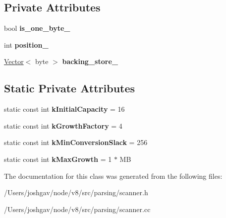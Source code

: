 \subsection*{Private Attributes}
\begin{DoxyCompactItemize}
\item 
bool {\bfseries is\+\_\+one\+\_\+byte\+\_\+}\hypertarget{classv8_1_1internal_1_1_literal_buffer_a0b65b23299a5431ba63163fb160f322f}{}\label{classv8_1_1internal_1_1_literal_buffer_a0b65b23299a5431ba63163fb160f322f}

\item 
int {\bfseries position\+\_\+}\hypertarget{classv8_1_1internal_1_1_literal_buffer_a65bf399de7ac72982a00ea580d3f575f}{}\label{classv8_1_1internal_1_1_literal_buffer_a65bf399de7ac72982a00ea580d3f575f}

\item 
\hyperlink{classv8_1_1internal_1_1_vector}{Vector}$<$ byte $>$ {\bfseries backing\+\_\+store\+\_\+}\hypertarget{classv8_1_1internal_1_1_literal_buffer_af72802fe1474aa6ccb1b0817d3b0252c}{}\label{classv8_1_1internal_1_1_literal_buffer_af72802fe1474aa6ccb1b0817d3b0252c}

\end{DoxyCompactItemize}
\subsection*{Static Private Attributes}
\begin{DoxyCompactItemize}
\item 
static const int {\bfseries k\+Initial\+Capacity} = 16\hypertarget{classv8_1_1internal_1_1_literal_buffer_a7e5dc5f31917faabf585f4283e0dad0b}{}\label{classv8_1_1internal_1_1_literal_buffer_a7e5dc5f31917faabf585f4283e0dad0b}

\item 
static const int {\bfseries k\+Growth\+Factory} = 4\hypertarget{classv8_1_1internal_1_1_literal_buffer_a26fbee59e283beb22b7525aaf870ad5d}{}\label{classv8_1_1internal_1_1_literal_buffer_a26fbee59e283beb22b7525aaf870ad5d}

\item 
static const int {\bfseries k\+Min\+Conversion\+Slack} = 256\hypertarget{classv8_1_1internal_1_1_literal_buffer_a158d7aced55af763b931223f5a8fdd5c}{}\label{classv8_1_1internal_1_1_literal_buffer_a158d7aced55af763b931223f5a8fdd5c}

\item 
static const int {\bfseries k\+Max\+Growth} = 1 $\ast$ MB\hypertarget{classv8_1_1internal_1_1_literal_buffer_a0613a4c4b0e516c72f15d24ff9689a9b}{}\label{classv8_1_1internal_1_1_literal_buffer_a0613a4c4b0e516c72f15d24ff9689a9b}

\end{DoxyCompactItemize}


The documentation for this class was generated from the following files\+:\begin{DoxyCompactItemize}
\item 
/\+Users/joshgav/node/v8/src/parsing/scanner.\+h\item 
/\+Users/joshgav/node/v8/src/parsing/scanner.\+cc\end{DoxyCompactItemize}
